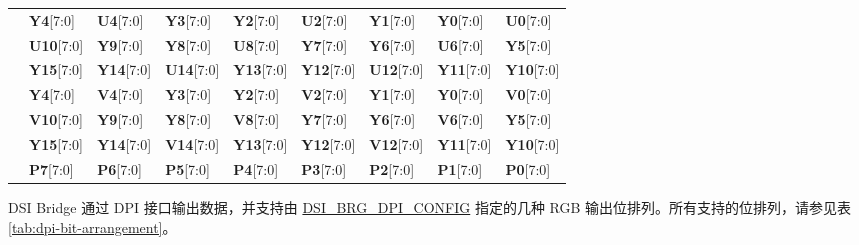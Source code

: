 \documentclass[main\_\_CN.tex]{subfiles}
\begin{document}
\begin{longtable}[c]{ |p{2cm}|p{1.5cm}|p{1.5cm}|p{1.5cm}|p{1.5cm}|p{1.5cm}|p{1.5cm}|p{1.5cm}|p{1.5cm}| }
         & \textbf{Y4}[7:0] & \textbf{U4}[7:0] & \textbf{Y3}[7:0] & \textbf{Y2}[7:0] & \textbf{U2}[7:0] & \textbf{Y1}[7:0] & \textbf{Y0}[7:0] & \textbf{U0}[7:0] \\
        & \textbf{U10}[7:0] & \textbf{Y9}[7:0] & \textbf{Y8}[7:0] & \textbf{U8}[7:0] & \textbf{Y7}[7:0] & \textbf{Y6}[7:0] & \textbf{U6}[7:0] & \textbf{Y5}[7:0] \\
        & \textbf{Y15}[7:0] & \textbf{Y14}[7:0] & \textbf{U14}[7:0] & \textbf{Y13}[7:0] & \textbf{Y12}[7:0] & \textbf{U12}[7:0] & \textbf{Y11}[7:0] & \textbf{Y10}[7:0] \\\hline

         & \textbf{Y4}[7:0] & \textbf{V4}[7:0] & \textbf{Y3}[7:0] & \textbf{Y2}[7:0] & \textbf{V2}[7:0] & \textbf{Y1}[7:0] & \textbf{Y0}[7:0] & \textbf{V0}[7:0] \\
        & \textbf{V10}[7:0] & \textbf{Y9}[7:0] & \textbf{Y8}[7:0] & \textbf{V8}[7:0] & \textbf{Y7}[7:0] & \textbf{Y6}[7:0] & \textbf{V6}[7:0] & \textbf{Y5}[7:0] \\
        & \textbf{Y15}[7:0] & \textbf{Y14}[7:0] & \textbf{V14}[7:0] & \textbf{Y13}[7:0] & \textbf{Y12}[7:0] & \textbf{V12}[7:0] & \textbf{Y11}[7:0] & \textbf{Y10}[7:0] \\\hline

         & \textbf{P7}[7:0] & \textbf{P6}[7:0] & \textbf{P5}[7:0] & \textbf{P4}[7:0] & \textbf{P3}[7:0] & \textbf{P2}[7:0] & \textbf{P1}[7:0] & \textbf{P0}[7:0] \\\hline


\end{longtable}
\normalsize

DSI Bridge 通过 DPI 接口输出数据，并支持由 \hyperref[fielddesc:DSIBRGDPICONFIG]{DSI\_BRG\_DPI\_CONFIG} 指定的几种 RGB 输出位排列。所有支持的位排列，请参见表 \ref{tab:dpi-bit-arrangement}。
\end{document}
